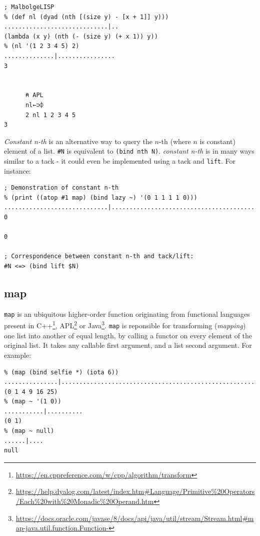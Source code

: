 \begin{verbatim}
; MalbolgeLISP
% (def nl (dyad (nth [(size y) - [x + 1]] y)))
.............................|..
(lambda (x y) (nth (- (size y) (+ x 1)) y))
% (nl '(1 2 3 4 5) 2)
..............|................
3


      ⍝ APL
      nl←⊃⌽
      2 nl 1 2 3 4 5
3
\end{verbatim}

\par \textit{Constant n-th} is an alternative way to query the $n$-th (where $n$ is constant) element of a list. \verb|#N| is equivalent to \verb|(bind nth N)|. \textit{constant n-th} is in many ways similar to a tack - it could even be implemented using a tack and \verb|lift|. For instance:

\begin{verbatim}
; Demonstration of constant n-th
% (print ((atop #1 map) (bind lazy ~) '(0 1 1 1 1 0)))
.............................|................................................
0

0

; Correspondence between constant n-th and tack/lift:
#N <=> (bind lift $N)
\end{verbatim}

\subsection{map}

\par \verb|map| is an ubiquitous higher-order function originating from functional languages present in C++\footnote{\url{https://en.cppreference.com/w/cpp/algorithm/transform}}, APL\footnote{\url{https://help.dyalog.com/latest/index.htm#Language/Primitive\%20Operators/Each\%20with\%20Monadic\%20Operand.htm}} or Java\footnote{\url{https://docs.oracle.com/javase/8/docs/api/java/util/stream/Stream.html#map-java.util.function.Function-}}. \verb|map| is reponsible for transforming (\textit{mapping}) one list into another of equal length, by calling a functor on every element of the original list. It takes any callable first argument, and a list second argument. For example:

\begin{verbatim}
% (map (bind selfie *) (iota 6))
...............|..........................................................
(0 1 4 9 16 25)
% (map ~ '(1 0))
...........|..........
(0 1)
% (map ~ null)
......|....
null
\end{verbatim}

